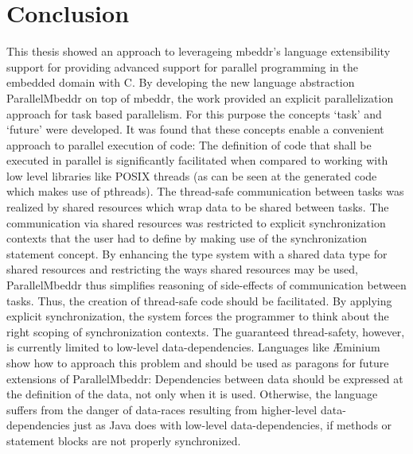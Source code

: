 \chapter{Conclusion}
\label{summary}

This thesis showed an approach to leverageing mbeddr's language extensibility support for providing advanced support for parallel programming in the embedded domain with C. By developing the new language abstraction ParallelMbeddr on top of mbeddr, the work provided an explicit parallelization approach for task based parallelism. For this purpose the concepts `task' and `future' were developed. It was found that these concepts enable a convenient approach to parallel execution of code: The definition of code that shall be executed in parallel is significantly facilitated when compared to working with low level libraries like POSIX threads (as can be seen at the generated code which makes use of pthreads). The thread-safe communication between tasks was realized by shared resources which wrap data to be shared between tasks. The communication via shared resources was restricted to explicit synchronization contexts that the user had to define by making use of the synchronization statement concept.
By enhancing the type system with a shared data type for shared resources and restricting the ways shared resources may be used, ParallelMbeddr thus simplifies reasoning of side-effects of communication between tasks. Thus, the creation of thread-safe code should be facilitated. By applying explicit synchronization, the system forces the programmer to think about the right scoping of synchronization contexts. The guaranteed thread-safety, however, is currently limited to low-level data-dependencies. Languages like \AE minium show how to approach this problem and should be used as paragons for future extensions of ParallelMbeddr: Dependencies between data should be expressed at the definition of the data, not only when it is used. Otherwise, the language suffers from the danger of data-races resulting from higher-level data-dependencies just as Java does with low-level data-dependencies, if methods or statement blocks are not properly synchronized.

